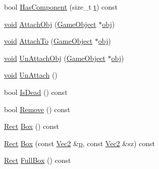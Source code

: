 \begin{DoxyCompactItemize}
\item 
bool \hyperlink{class_game_object_a8af9140575b27499516b3f07407ffbea}{Has\-Component} (size\-\_\-t \hyperlink{_s_d_l__opengl_8h_a7d65d00ca3b0630d9b5c52df855b19f5}{t}) const 
\item 
\hyperlink{_s_d_l__opengles2__gl2ext_8h_ae5d8fa23ad07c48bb609509eae494c95}{void} \hyperlink{class_game_object_a7d4f09a352a5c57c4de3e54a1f81ff33}{Attach\-Obj} (\hyperlink{class_game_object}{Game\-Object} $\ast$\hyperlink{_s_d_l__opengl__glext_8h_a0c0d4701a6c89f4f7f0640715d27ab26}{obj})
\item 
\hyperlink{_s_d_l__opengles2__gl2ext_8h_ae5d8fa23ad07c48bb609509eae494c95}{void} \hyperlink{class_game_object_aa282a44e36f9de280f6fc1a8e69af572}{Attach\-To} (\hyperlink{class_game_object}{Game\-Object} $\ast$\hyperlink{_s_d_l__opengl__glext_8h_a0c0d4701a6c89f4f7f0640715d27ab26}{obj})
\item 
\hyperlink{_s_d_l__opengles2__gl2ext_8h_ae5d8fa23ad07c48bb609509eae494c95}{void} \hyperlink{class_game_object_ad898f0c798075f44c17c2d908abcd48b}{Un\-Attach\-Obj} (\hyperlink{class_game_object}{Game\-Object} $\ast$\hyperlink{_s_d_l__opengl__glext_8h_a0c0d4701a6c89f4f7f0640715d27ab26}{obj})
\item 
\hyperlink{_s_d_l__opengles2__gl2ext_8h_ae5d8fa23ad07c48bb609509eae494c95}{void} \hyperlink{class_game_object_a1d40c32b909fe5bf15155b5a6ad42734}{Un\-Attach} ()
\item 
bool \hyperlink{class_game_object_ae94cb0510c69e88a66cd7e9e0913a345}{Is\-Dead} () const 
\item 
bool \hyperlink{class_game_object_a12c267661d745a9fd1f5fe1e768a57ae}{Remove} () const 
\item 
\hyperlink{class_rect}{Rect} \hyperlink{class_game_object_afb1f54116e5e4512f62e82efe245612c}{Box} () const 
\item 
\hyperlink{class_rect}{Rect} \hyperlink{class_game_object_a171e1413212ca165de17bf34ed912edf}{Box} (const \hyperlink{class_vec2}{Vec2} \&\hyperlink{_s_d_l__opengl__glext_8h_aa5367c14d90f462230c2611b81b41d23}{p}, const \hyperlink{class_vec2}{Vec2} \&sz) const 
\item 
\hyperlink{class_rect}{Rect} \hyperlink{class_game_object_a854b11e3c43cc3802f579ff63053133e}{Full\-Box} () const 
\end{DoxyCompactItemize}
